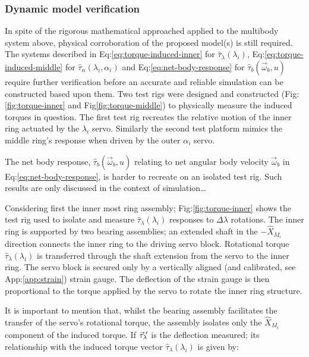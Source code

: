 \subsubsection{Dynamic model verification}
In spite of the rigorous mathematical approached applied to the multibody system above, physical corroboration of the proposed model(s) is still required. The systems described in Eq:\ref{eq:torque-induced-inner} for $\hat{\tau}_\lambda(\lambda_i)$, Eq:\ref{eq:torque-induced-middle} for $\hat{\tau}_\alpha(\lambda_i,\alpha_i)$ and Eq:\ref{eq:net-body-response} for $\hat{\tau}_b(\vec{\omega}_b,u)$ require further verification before an accurate and reliable simulation can be constructed based upon them. Two test rigs were designed and constructed (Fig:\ref{fig:torque-inner} and Fig\ref{fig:torque-middle}) to physically measure the induced torques in question. The first test rig recreates the relative motion of the inner ring actuated by the $\lambda_i$ servo. Similarly the second test platform mimics the middle ring's response when driven by the outer $\alpha_i$ servo. 
\par
The net body response, $\hat{\tau}_b(\vec{\omega}_b,u)$ relating to net angular body velocity $\vec{\omega}_b$ in Eq:\ref{eq:net-body-response}, is harder to recreate on an isolated test rig. Such results are only discussed in the context of simulation\ldots
\par
Considering first the inner most ring assembly; Fig:\ref{fig:torque-inner} shows the test rig used to isolate and measure $\hat{\tau}_\lambda(\lambda_i)$ responses to $\Delta\lambda$ rotations. The inner ring is supported by two bearing assemblies; an extended shaft in the $-\hat{X}_{M_i}$ direction connects the inner ring to the driving servo block. Rotational torque $\hat{\tau}_\lambda(\lambda_i)$ is transferred through the shaft extension from the servo to the inner ring. The servo block is secured only by a vertically aligned (and calibrated, see App:\ref{app:strain}) strain gauge. The deflection of the strain gauge is then proportional to the torque applied by the servo to rotate the inner ring structure.
\par
It is important to mention that, whilst the bearing assembly facilitates the transfer of the servo's rotational torque, the assembly isolates only the $\hat{X}_{M_i}$ component of the induced torque. If $\vec{\tau}_{\lambda}\text{}\hspace{-2pt}'$ is the deflection measured; its relationship with the induced torque vector $\hat{\tau}_{\lambda}(\lambda_i)$ is given by:
